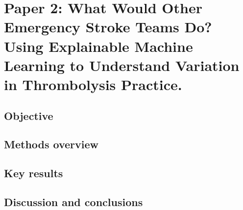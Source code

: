 \section{Paper 2: What Would Other Emergency Stroke Teams Do? Using Explainable Machine Learning to Understand Variation in Thrombolysis Practice.\cite{pearn_what_2023}}\label{sec:paper_2}

\subsection{Objective}

\subsection{Methods overview}

\subsection{Key results}

\subsection{Discussion and conclusions}